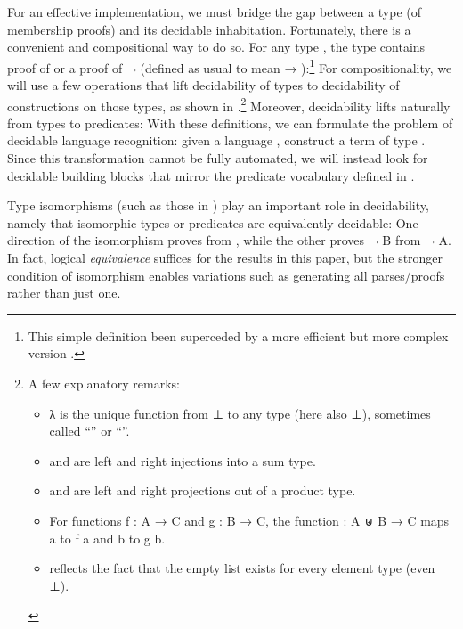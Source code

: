\documentclass[acmsmall,screen,anonymous,timestamp]{acmart}
\begin{document}
For an effective implementation, we must bridge the gap between a type (of membership proofs) and its decidable inhabitation.
Fortunately, there is a convenient and compositional way to do so.
For any type , the type { } contains proof of  or a proof of {\AF ¬ } (defined as usual to mean { \AS → }):\footnote{This simple  definition been superceded by a more efficient but more complex version .}
For compositionality, we will use a few operations that lift decidability of types to decidability of constructions on those types, as shown in .\footnote{%
A few explanatory remarks:
\begin{itemize}

\item {\AS λ \AS{()}} is the unique function from \AD ⊥ to any type (here also {\AD ⊥}),  sometimes called ``'' or ``''.

\item {} and  are left and right injections into a sum type.

\item {} and  are left and right projections out of a product type.

\item For functions {\AB f \AS : \AB A \AS → \AB C} and {\AB g \AS : \AB B \AS → C}, the function {\AF [ \AB f \AF , \AB g \AF ] \AS : \AB A \AF ⊎ \AB B \AS → \AB C} maps { \AB a} to {\AB f \AB a} and { \AB b} to {\AB g \AB b}.

\item {} reflects the fact that the empty list exists for every element type (even \AF ⊥).

\end{itemize}

}
Moreover, decidability lifts naturally from types to predicates:
With these definitions, we can formulate the problem of decidable language recognition: given a language , construct a term of type { }.
Since this transformation cannot be fully automated, we will instead look for decidable building blocks that mirror the predicate vocabulary defined in .

Type isomorphisms (such as those in ) play an important role in decidability, namely that isomorphic types or predicates are equivalently decidable:
One direction of the isomorphism proves  from , while the other proves {\AF ¬ B} from {\AF ¬ A}.
In fact, logical \emph{equivalence} suffices for the results in this paper, but the stronger condition of isomorphism enables variations such as generating all parses/proofs rather than just one.
\end{document}
